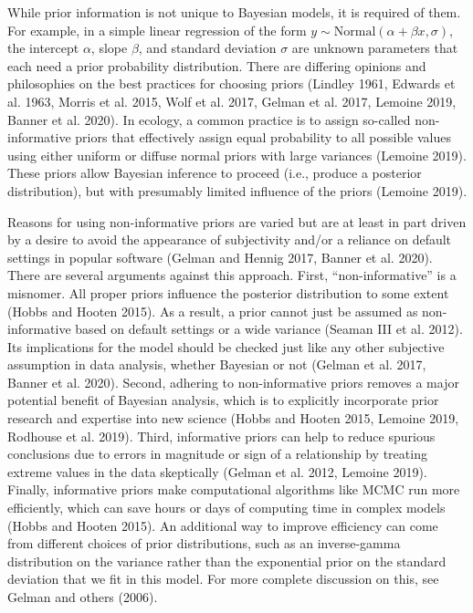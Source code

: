 \documentclass[
  12pt,
]{article}
\begin{document}
While prior information is not unique to Bayesian models, it is required
of them. For example, in a simple linear regression of the form
\(y \sim \text{Normal}(\alpha + \beta x, \sigma)\), the intercept
\(\alpha\), slope \(\beta\), and standard deviation \(\sigma\) are
unknown parameters that each need a prior probability distribution.
There are differing opinions and philosophies on the best practices for
choosing priors (Lindley 1961, Edwards et al. 1963, Morris et al. 2015,
Wolf et al. 2017, Gelman et al. 2017, Lemoine 2019, Banner et al. 2020).
In ecology, a common practice is to assign so-called non-informative
priors that effectively assign equal probability to all possible values
using either uniform or diffuse normal priors with large variances
(Lemoine 2019). These priors allow Bayesian inference to proceed (i.e.,
produce a posterior distribution), but with presumably limited influence
of the priors (Lemoine 2019).

Reasons for using non-informative priors are varied but are at least in
part driven by a desire to avoid the appearance of subjectivity and/or a
reliance on default settings in popular software (Gelman and Hennig
2017, Banner et al. 2020). There are several arguments against this
approach. First, ``non-informative'' is a misnomer. All proper priors
influence the posterior distribution to some extent (Hobbs and Hooten
2015). As a result, a prior cannot just be assumed as non-informative
based on default settings or a wide variance (Seaman III et al. 2012).
Its implications for the model should be checked just like any other
subjective assumption in data analysis, whether Bayesian or not (Gelman
et al. 2017, Banner et al. 2020). Second, adhering to non-informative
priors removes a major potential benefit of Bayesian analysis, which is
to explicitly incorporate prior research and expertise into new science
(Hobbs and Hooten 2015, Lemoine 2019, Rodhouse et al. 2019). Third,
informative priors can help to reduce spurious conclusions due to errors
in magnitude or sign of a relationship by treating extreme values in the
data skeptically (Gelman et al. 2012, Lemoine 2019). Finally,
informative priors make computational algorithms like MCMC run more
efficiently, which can save hours or days of computing time in complex
models (Hobbs and Hooten 2015). An additional way to improve efficiency
can come from different choices of prior distributions, such as an
inverse-gamma distribution on the variance rather than the exponential
prior on the standard deviation that we fit in this model. For more
complete discussion on this, see Gelman and others (2006).
\end{document}
